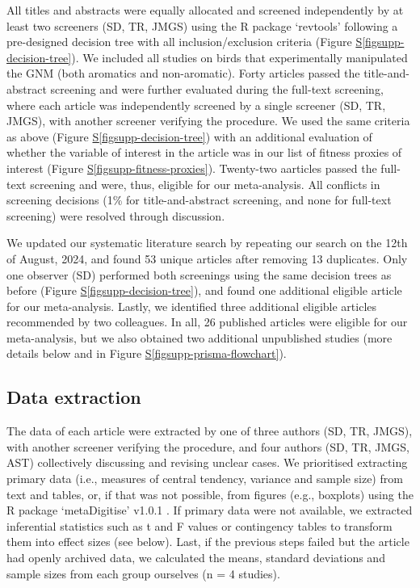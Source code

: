 \documentclass[
  number,
  review,
  onecolumn]{elsarticle}
\newcommand*\quartofigsuppref[1]{Figure \hyperref[#1]{S\ref{#1}}}
\begin{document}
All titles and abstracts were equally allocated and screened
independently by at least two screeners (SD, TR, JMGS) using the R
package `revtools' following a pre-designed decision tree with all
inclusion/exclusion criteria (\quartofigsuppref{figsupp-decision-tree}).
We included all studies on birds that experimentally manipulated the GNM
(both aromatics and non-aromatic). Forty articles passed the
title-and-abstract screening and were further evaluated during the
full-text screening, where each article was independently screened by a
single screener (SD, TR, JMGS), with another screener verifying the
procedure. We used the same criteria as above
(\quartofigsuppref{figsupp-decision-tree}) with an additional evaluation
of whether the variable of interest in the article was in our list of
fitness proxies of interest
(\quartofigsuppref{figsupp-fitness-proxies}). Twenty-two aarticles
passed the full-text screening and were, thus, eligible for our
meta-analysis. All conflicts in screening decisions (1\% for
title-and-abstract screening, and none for full-text screening) were
resolved through discussion.

We updated our systematic literature search by repeating our search on
the 12th of August, 2024, and found 53 unique articles after removing 13
duplicates. Only one observer (SD) performed both screenings using the
same decision trees as before
(\quartofigsuppref{figsupp-decision-tree}), and found one additional
eligible article for our meta-analysis. Lastly, we identified three
additional eligible articles recommended by two colleagues. In all, 26
published articles were eligible for our meta-analysis, but we also
obtained two additional unpublished studies (more details below and in
\quartofigsuppref{figsupp-prisma-flowchart}).

\subsection{Data extraction}\label{data-extraction}

The data of each article were extracted by one of three authors (SD, TR,
JMGS), with another screener verifying the procedure, and four authors
(SD, TR, JMGS, AST) collectively discussing and revising unclear cases.
We prioritised extracting primary data (i.e., measures of central
tendency, variance and sample size) from text and tables, or, if that
was not possible, from figures (e.g., boxplots) using the R package
`metaDigitise' v1.0.1 \citep{pick2018}. If primary data were not
available, we extracted inferential statistics such as t and F values or
contingency tables to transform them into effect sizes (see below).
Last, if the previous steps failed but the article had openly archived
data, we calculated the means, standard deviations and sample sizes from
each group ourselves (n = 4 studies).
\end{document}
